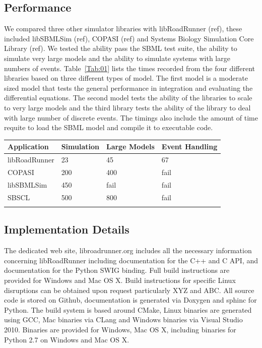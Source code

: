 \documentclass{bioinfo}
\begin{document}
\begin{methods}
\subsection{Performance}

We compared three other simulator libraries with libRoadRunner (ref), these included libSBMLSim (ref), COPASI (ref) and Systems Biology Simulation Core Library (ref). We tested the ability pass the SBML test suite, the ability to simulate very large models and the ability to simulate systems with large numbers of events. Table~\ref{Tab:01} lists the times recorded from the four different libraries based on three different types of model. The first model is a moderate sized model that tests the general performance in integration and evaluating the differential equations. The second model tests the ability of the libraries to scale to very large models and the third library tests the ability of the library to deal with large number of discrete events. The timings also include the amount of time requite to load the SBML model and compile it to executable code.
%
\begin{table}[!t]
{\begin{tabular}{llll}\toprule
Application & Simulation & Large Models & Event Handling\\\midrule
libRoadRunner & 23 & 45 & 67  \\
COPASI & 200 & 400 & fail\\
libSBMLSim & 450 & fail & fail\\
SBSCL & 500 & 800 & fail \\ \botrule
\end{tabular}}{}
\end{table}

\subsection*{Implementation Details}

The dedicated web site, libroadrunner.org includes all the necessary information concerning libRoadRunner including documentation for the C++ and C API, and documentation for the Python SWIG binding. Full build instructions are provided for Windows and Mac OS X. Build instructions for specific Linux disruptions can be obtained upon request particularly XYZ and ABC. All source code is stored on Github, documentation is generated via Doxygen and sphinc for Python. The build system is based around CMake, Linux binaries are generated using GCC, Mac binaries via CLang \citealp{Boffelli03} and Windows binaries via Visual Studio 2010. Binaries are provided for Windows, Mac OS X, including binaries for Python 2.7 on Windows and Mac OS X.



\end{methods}
\end{document}

